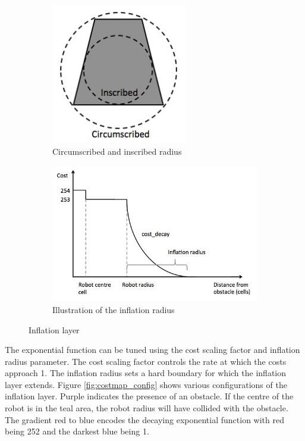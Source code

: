\documentclass[capstone_report.tex]{subfiles}
\begin{document}
\begin{figure}[H]
    \centering
    \begin{subfigure}[b]{0.5\textwidth}
        \centering
        \includegraphics[width=0.65\textwidth]{./imgs/circumscribed.jpg}
        \caption{Circumscribed and inscribed radius}
        \label{fig:circumscribed}
    \end{subfigure}%
    \begin{subfigure}[b]{0.5\textwidth}
        \centering
        \includegraphics[width=1.1\textwidth]{./imgs/inflation_radius.jpg}
        \caption{Illustration of the inflation radius}
        \label{fig:inflation_radius}
    \end{subfigure}
    \caption{Inflation layer\label{fig:inflation_layer}}
\end{figure}

The exponential function can be tuned using the cost scaling factor and inflation radius parameter.  The cost scaling factor controls the rate at which the costs approach 1.  The inflation radius sets a hard boundary for which the inflation layer extends.  Figure \ref{fig:costmap_config} shows various configurations of the inflation layer.  Purple indicates the presence of an obstacle.  If the centre of the robot is in the teal area, the robot radius will have collided with the obstacle.  The gradient red to blue encodes the decaying exponential function with red being 252 and the darkest blue being 1.\\
\end{document}
